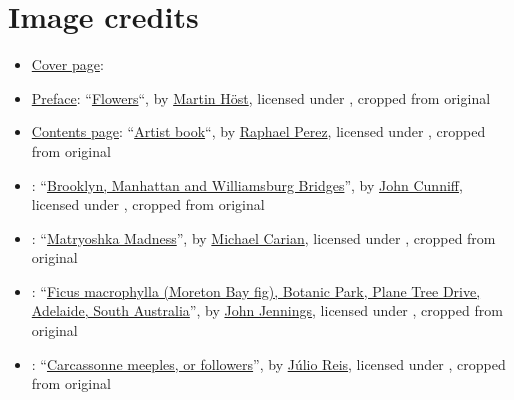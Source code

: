 


\chapter{Image credits}

\begin{itemize}

\item \hyperlink{page.i}{Cover page}:

\item \hyperlink{page.ii}{Preface}: ``\href{https://www.flickr.com/photos/martin_l_h/34514200226/}{Flowers}``, by \href{https://www.flickr.com/people/martin_l_h/}{Martin Höst}, licensed under , cropped from original

\item \hyperlink{page.iii}{Contents page}: ``\href{https://www.flickr.com/photos/naivepaintings/43496736484/}{Artist book}``, by \href{https://www.flickr.com/people/naivepaintings/}{Raphael Perez}, licensed under , cropped from original

\item {}:
``\href{https://www.flickr.com/photos/johncunniff/19486177769/}{Brooklyn, Manhattan and Williamsburg Bridges}'', by \href{https://www.flickr.com/photos/johncunniff/}{John Cunniff}, licensed under , cropped from original

\item {}: ``\href{https://www.flickr.com/photos/carianoff/4484964103/}{Matryoshka Madness}'', by \href{https://www.flickr.com/photos/carianoff/}{Michael Carian}, licensed under , cropped from original

\item {}: ``\href{https://www.flickr.com/photos/124930081@N08/31594099295/}{Ficus macrophylla (Moreton Bay fig), Botanic Park, Plane Tree Drive, Adelaide, South Australia}'', by \href{https://www.flickr.com/photos/124930081@N08/}{John Jennings}, licensed under , cropped from original

\item {}: ``\href{https://commons.wikimedia.org/wiki/File:Carcassonne_Miples.jpg}{Carcassonne meeples, or followers}'', by \href{https://commons.wikimedia.org/wiki/User:Tintazul}{Júlio Reis}, licensed under , cropped from original


\end{itemize}
